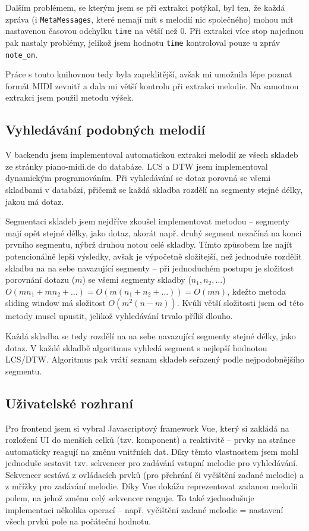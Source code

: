 Dalším problémem, se kterým jsem se při extrakci potýkal, byl ten, že každá zpráva (i \lstinline{MetaMessages}, které nemají mít s melodií nic společného) mohou mít nastavenou časovou odchylku \lstinline{time} na větší než 0. Při extrakci více stop najednou pak nastaly problémy, jelikož jsem hodnotu \lstinline{time} kontroloval pouze u zpráv \lstinline{note_on}.

Práce s touto knihovnou tedy byla zapeklitější, avšak mi umožnila lépe poznat formát MIDI zevnitř a dala mi větší kontrolu při extrakci melodie. Na samotnou extrakci jsem použil metodu výšek.


\subsection{Vyhledávání podobných melodií}
V backendu jsem implementoval automatickou extrakci melodií ze všech skladeb ze stránky piano-midi.de do databáze. LCS a DTW jsem implementoval dynamickým programováním. Při vyhledávání se dotaz porovná se všemi skladbami v databázi, přičemž se každá skladba rozdělí na segmenty stejné délky, jakou má dotaz.

Segmentaci skladeb jsem nejdříve zkoušel implementovat metodou  -- segmenty mají opět stejné délky, jako dotaz, akorát např. druhý segment nezačíná na konci prvního segmentu, nýbrž druhou notou celé skladby. Tímto způsobem lze najít potencionálně lepší výsledky, avšak je výpočetně složitejší, než jednoduše rozdělit skladbu na na sebe navazující segmenty -- při jednoduchém postupu je složitost porovnání dotazu ($m$) se všemi segmenty skladby ($n_1, n_2, \ldots$) $O(mn_1 + mn_2 + \ldots) = O(m(n_1 + n_2 + \ldots)) = O(mn)$, kdežto metoda sliding window má složitost $O(m^2(n - m))$. Kvůli větší složitosti jsem od této metody musel upustit, jelikož vyhledávání trvalo příliš dlouho.

Každá skladba se tedy rozdělí na na sebe navazující segmenty stejné délky, jako dotaz. V každé skladbě algoritmus vyhledá segment s nejlepší hodnotou LCS/DTW. Algoritmus pak vrátí seznam skladeb seřazený podle nejpodobnějšího segmentu.

\subsection{Uživatelské rozhraní}
Pro frontend jsem si vybral Javascriptový framework Vue, který si zakládá na rozložení UI do menších celků (tzv. komponent) a reaktivitě -- prvky na stránce automaticky reagují na změnu vnitřních dat. Díky těmto vlastnostem jsem mohl jednoduše sestavit tzv. sekvencer pro zadávání vstupní melodie pro vyhledávání. Sekvencer sestává z ovládacích prvků (pro přehrání či vyčištění zadané melodie) a z mřížky pro zadávání melodie. Díky Vue dokážu reprezentovat zadanou melodii polem, na jehož změnu celý sekvencer reaguje. To také zjednodušuje implementaci několika operací -- např. vyčištění zadané melodie = nastavení všech prvků pole na počáteční hodnotu.

